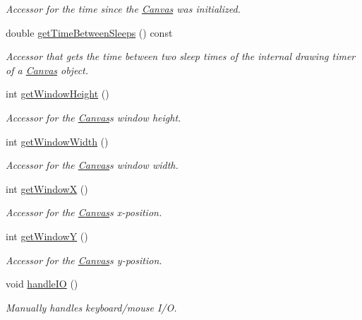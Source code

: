 \begin{DoxyCompactItemize}
\begin{DoxyCompactList}\small\item\em Accessor for the time since the \hyperlink{classtsgl_1_1_canvas}{Canvas} was initialized. \end{DoxyCompactList}\item 
double \hyperlink{classtsgl_1_1_canvas_a8786d28042b767f5c075361100227af4}{get\+Time\+Between\+Sleeps} () const 
\begin{DoxyCompactList}\small\item\em Accessor that gets the time between two sleep times of the internal drawing timer of a \hyperlink{classtsgl_1_1_canvas}{Canvas} object. \end{DoxyCompactList}\item 
int \hyperlink{classtsgl_1_1_canvas_ad740ebe5d6bd69ab79cde3e84f369f35}{get\+Window\+Height} ()
\begin{DoxyCompactList}\small\item\em Accessor for the \hyperlink{classtsgl_1_1_canvas}{Canvas}\textquotesingle{}s window height. \end{DoxyCompactList}\item 
int \hyperlink{classtsgl_1_1_canvas_a086a0322f4a6ab27da6929b1aa0593af}{get\+Window\+Width} ()
\begin{DoxyCompactList}\small\item\em Accessor for the \hyperlink{classtsgl_1_1_canvas}{Canvas}\textquotesingle{}s window width. \end{DoxyCompactList}\item 
int \hyperlink{classtsgl_1_1_canvas_a011ce2354d4565f9d2a323411a47d52d}{get\+Window\+X} ()
\begin{DoxyCompactList}\small\item\em Accessor for the \hyperlink{classtsgl_1_1_canvas}{Canvas}\textquotesingle{}s x-\/position. \end{DoxyCompactList}\item 
int \hyperlink{classtsgl_1_1_canvas_ad6e98d17d3e43d79628a3bd05221ee8b}{get\+Window\+Y} ()
\begin{DoxyCompactList}\small\item\em Accessor for the \hyperlink{classtsgl_1_1_canvas}{Canvas}\textquotesingle{}s y-\/position. \end{DoxyCompactList}\item 
void \hyperlink{classtsgl_1_1_canvas_aa499851e5e4b97bb99ca4fb3d633c17e}{handle\+I\+O} ()
\begin{DoxyCompactList}\small\item\em Manually handles keyboard/mouse I/\+O. \end{DoxyCompactList}\item 

\end{DoxyCompactItemize}
